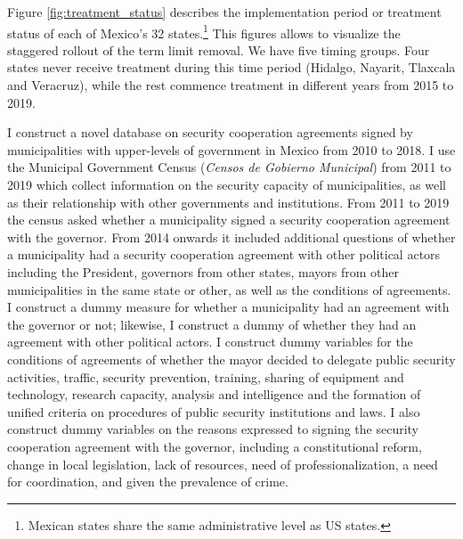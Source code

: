 \documentclass[12pt]{amsart}
\makeatletter
\def\section{\@startsection{section}{1}
	\z@{1.0\linespacing\@plus\linespacing}{.5\linespacing}{\Large}}
\numberwithin{equation}{section}
\theoremstyle{definition}
\theoremstyle{definition}
\theoremstyle{definition}
\makeatother
\begin{document}
Figure \ref{fig:treatment_status} describes the implementation period or treatment status of each of Mexico's 32 states.\footnote{Mexican states share the same administrative level as US states.} This figures allows to visualize the staggered rollout of the term limit removal. We have five timing groups. Four states never receive treatment during this time period (Hidalgo, Nayarit, Tlaxcala and Veracruz), while the rest commence treatment in different years from 2015 to 2019. %
    

\section{Data \label{sec:data}}  

I construct a novel database on security cooperation agreements signed by municipalities with upper-levels of government in Mexico from 2010 to 2018. I use the Municipal Government Census (\emph{Censos de Gobierno Municipal}) from 2011 to 2019 which collect information on the security capacity of municipalities, as well as their relationship with other governments and institutions. From 2011 to 2019 the census asked whether a municipality signed a security cooperation agreement with the governor. From 2014 onwards it included additional questions of whether a municipality had a security cooperation agreement with other political actors including the President, governors from other states, mayors from other municipalities in the same state or other, as well as the conditions of agreements. I construct a dummy measure for whether a municipality had an agreement with the governor or not; likewise, I construct a dummy of whether they had an agreement with other political actors. I construct dummy variables for the conditions of agreements of whether the mayor decided to delegate public security activities, traffic, security prevention, training, sharing of equipment and technology, research capacity, analysis and intelligence and the formation of unified criteria on procedures of public security institutions and laws. I also construct dummy variables on the reasons expressed to signing the security cooperation agreement with the governor, including a constitutional reform, change in local legislation, lack of resources, need of professionalization, a need for coordination, and given the prevalence of crime.
 
\end{document}
